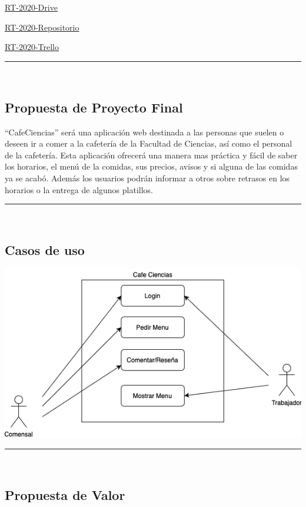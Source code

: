 \documentclass{article}
\begin{document}
\href{https://drive.google.com/open?id=13f9jp3Oli6AQF1Ap8VhoEKFXTPULumos}{RT-2020-Drive}

\href{https://github.com/mildewyPrawn/CafeCiencias}{RT-2020-Repositorio}

\href{https://trello.com/b/rwdAGuSi/cafeciencias}{RT-2020-Trello}

\rule{0.8\textwidth}{.8pt}\\

\subsection*{Propuesta de Proyecto Final}

“CafeCiencias” será una aplicación web destinada a las personas que suelen o
deseen ir a comer a la cafetería de la Facultad de Ciencias, así como el personal
de la cafetería. Esta aplicación ofrecerá una manera mas práctica y fácil de
saber los horarios, el menú de la comidas, sus precios, avisos y si alguna de las
comidas ya se  acabó. Además los usuarios podrán informar a otros sobre retrasos
en los horarios o la entrega de algunos platillos.

\rule{0.8\textwidth}{.8pt}\\

\subsection*{Casos de uso}

\begin{center}
  \includegraphics[scale=.75]{../imagenes/CasoDeUsos.png}
\end{center}

\rule{0.8\textwidth}{.8pt}\\

\subsection*{Propuesta de Valor}
\end{document}
